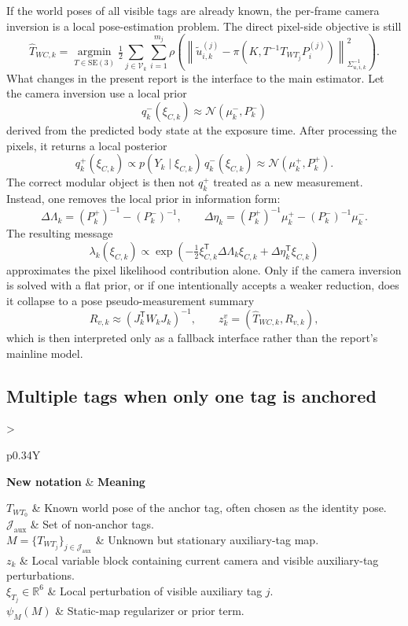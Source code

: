 \documentclass[11pt]{report}
\newcommand{\SE}{\mathrm{SE}(3)}
\newcommand{\R}{\mathbb{R}}
\newcommand{\argmin}{\operatorname*{argmin}}
\newcommand{\Normal}{\mathcal{N}}
\newcommand{\norm}[1]{\left\lVert #1 \right\rVert}
\newcommand{\tran}{^{\mathsf T}}
\newcommand{\Half}{\tfrac12}
\newcommand{\NotationTable}[1]{%
\vspace{0.6mm}
{\scriptsize
\setlength{\tabcolsep}{2.5pt}
\begin{tabularx}{\columnwidth}{>{\raggedright\arraybackslash}p{0.34\columnwidth}Y}
\toprule
\textbf{New notation} & \textbf{Meaning}\\
\midrule
#1\\
\bottomrule
\end{tabularx}}
\vspace{0.8mm}}
\begin{document}
If the world poses of all visible tags are already known, the per-frame camera inversion is a local pose-estimation problem. The direct pixel-side objective is still
\begin{equation}
\widehat T_{WC,k}=\argmin_{T\in\SE}\Half\sum_{j\in\mathcal V_k}\sum_{i=1}^{m_j}
\rho\!\left(
\norm{\widetilde u_{i,k}^{(j)}-\pi(K,T^{-1}T_{WT_j}P_i^{(j)})}_{\Sigma_{u,i,k}^{-1}}^2
\right).
\label{eq:front_end_pose_only_sweep}
\end{equation}
What changes in the present report is the interface to the main estimator. Let the camera inversion use a local prior
\[
q^-_k(\xi_{C,k}) \approx \Normal(\mu^-_k,P^-_k)
\]
derived from the predicted body state at the exposure time. After processing the pixels, it returns a local posterior
\[
q^+_k(\xi_{C,k}) \propto p(Y_k\mid \xi_{C,k})\,q^-_k(\xi_{C,k})
\approx \Normal(\mu^+_k,P^+_k).
\]
The correct modular object is then not $q^+_k$ treated as a new measurement. Instead, one removes the local prior in information form:
\begin{equation}
\Delta\Lambda_k = (P^+_k)^{-1}-(P^-_k)^{-1},
\qquad
\Delta\eta_k = (P^+_k)^{-1}\mu^+_k-(P^-_k)^{-1}\mu^-_k.
\label{eq:prior_removed_message_pose_only}
\end{equation}
The resulting message
\[
\lambda_k(\xi_{C,k}) \propto
\exp\!\left(-\Half \xi_{C,k}\tran\Delta\Lambda_k\xi_{C,k}
+ \Delta\eta_k\tran \xi_{C,k}\right)
\]
approximates the pixel likelihood contribution alone. Only if the camera inversion is solved with a flat prior, or if one intentionally accepts a weaker reduction, does it collapse to a pose pseudo-measurement summary
\begin{equation}
R_{v,k}\approx(J_k\tran W_kJ_k)^{-1},
\qquad
z_k^v=(\widehat T_{WC,k},R_{v,k}),
\label{eq:pose_covariance_from_hessian_sweep}
\end{equation}
which is then interpreted only as a fallback interface rather than the report's mainline model.

\subsection{Multiple tags when only one tag is anchored}
\NotationTable{
$T_{WT_0}$ & Known world pose of the anchor tag, often chosen as the identity pose.\\
$\mathcal J_{\mathrm{aux}}$ & Set of non-anchor tags.\\
$M=\{T_{WT_j}\}_{j\in\mathcal J_{\mathrm{aux}}}$ & Unknown but stationary auxiliary-tag map.\\
$z_k$ & Local variable block containing current camera and visible auxiliary-tag perturbations.\\
$\xi_{T_j}\in\R^6$ & Local perturbation of visible auxiliary tag $j$.\\
$\psi_M(M)$ & Static-map regularizer or prior term.}
\end{document}
